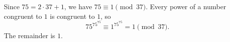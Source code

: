 Since $75=2\cdot37+1$, we have $75\equiv1\pmod{37}$. Every power of a number congruent to $1$ is congruent to $1$, so
\[
75^{75^{75}}\equiv1^{75^{75}}=1\pmod{37}.
\]
The remainder is $\boxed{1}$.
